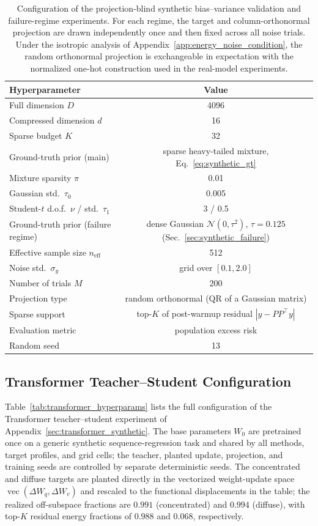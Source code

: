 \begin{table}[htbp]
\centering
\small
\begin{tabular}{lc}
\toprule
Hyperparameter & Value \\
\midrule
Full dimension \(D\) & 4096 \\
Compressed dimension \(d\) & 16 \\
Sparse budget \(K\) & 32 \\
Ground-truth prior (main) & sparse heavy-tailed mixture, Eq.~\eqref{eq:synthetic_gt} \\
Mixture sparsity \(\pi\) & 0.01 \\
Gaussian std.\ \(\tau_0\) & 0.005 \\
Student-\(t\) d.o.f.\ \(\nu\) / std.\ \(\tau_1\) & 3 / 0.5 \\
Ground-truth prior (failure regime) & dense Gaussian \(\mathcal{N}(0,\tau^2)\), \(\tau=0.125\) (Sec.~\ref{sec:synthetic_failure}) \\
Effective sample size \(n_{\mathrm{eff}}\) & 512 \\
Noise std.\ \(\sigma_y\) & grid over \([0.1, 2.0]\) \\
Number of trials \(M\) & 200 \\
Projection type & random orthonormal (QR of a Gaussian matrix) \\
Sparse support & top-\(K\) of post-warmup residual \(|y-PP^\top y|\) \\
Evaluation metric & population excess risk \\
Random seed & 13 \\
\bottomrule
\end{tabular}
\caption{Configuration of the projection-blind synthetic bias--variance validation and failure-regime experiments. For each regime, the target and column-orthonormal projection are drawn independently once and then fixed across all noise trials. Under the isotropic analysis of Appendix~\ref{app:energy_noise_condition}, the random orthonormal projection is exchangeable in expectation with the normalized one-hot construction used in the real-model experiments.}
\label{tab:synthetic_hyperparams}
\end{table}

\subsection{Transformer Teacher--Student Configuration}
\label{app:transformer_details}

Table~\ref{tab:transformer_hyperparams} lists the full configuration of the
Transformer teacher--student experiment of Appendix~\ref{sec:transformer_synthetic}.
The base parameters $W_0$ are pretrained once on a generic synthetic
sequence-regression task and shared by all methods, target profiles, and grid
cells; the teacher, planted update, projection, and training seeds are
controlled by separate deterministic seeds.
The concentrated and diffuse targets are planted directly in the vectorized
weight-update space $\operatorname{vec}(\Delta W_q,\Delta W_v)$ and rescaled
to the functional displacements in the table; the realized off-subspace
fractions are $0.991$ (concentrated) and $0.994$ (diffuse), with top-$K$
residual energy fractions of $0.988$ and $0.068$, respectively.

